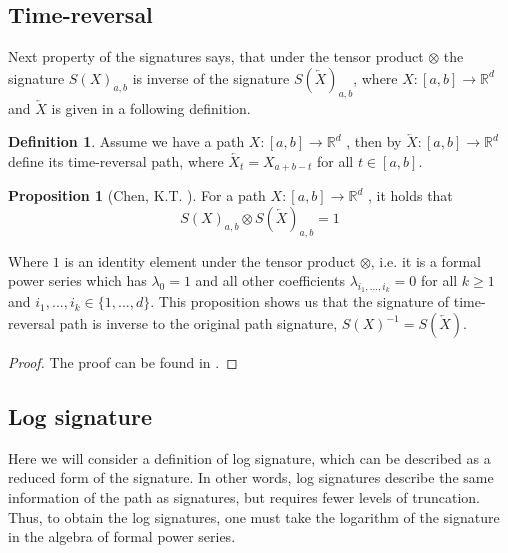 \documentclass[12pt,a4paper]{report}
\theoremstyle{definition}
\newtheorem{proposition}{Proposition}
\newtheorem{definition}{Definition}
\begin{document}
\subsection{Time-reversal}

Next property of the signatures says, that under the tensor product $\otimes$ the signature $S(X)_{a,b}$ is inverse of the signature $S(\overleftarrow{X})_{a,b}$, where $X :[a, b] \rightarrow \mathbb{R}^d$ and $\overleftarrow{X}$ is given in a following definition. %
\begin{definition}
	Assume we have a path $X :[a, b] \rightarrow \mathbb{R}^d$ , then by $\overleftarrow{X} : [a, b] \rightarrow \mathbb{R}^d$ define its time-reversal path, where $\overleftarrow{X_t} = X_{a+b-t}$ for all $t \in [a, b]$.
\end{definition}

\begin{proposition}[Chen, K.T. \cite{chen2001iterated}]
	For a path $X :[a, b] \rightarrow \mathbb{R}^d$ , it holds that 
	\begin{equation}
		S(X)_{a,b}\otimes S(\overleftarrow{X})_{a,b}=1
	\end{equation}
\end{proposition}

	Where $1$ is an identity element under the tensor product $\otimes$, i.e. it is a formal power series which has $\lambda_0=1$ and all other coefficients $\lambda_{i_1, . . . , i_k}=0$ for all $k\geq1$ and $i_1, . . . , i_k\in \{1,...,d\}$. This proposition shows us that the signature of time-reversal path is inverse to the original path signature, $S(X)^{-1}=S(\overleftarrow{X})$.
\begin{proof}
	The proof can be found in \parencite[][Proposition 1.4]{fermanian2021learning}.
\end{proof}	 



\subsection{Log signature}



Here we will consider a definition of log signature, which can be described as a reduced form of the signature. In other words, log signatures describe the same  information of the path as signatures, but requires fewer levels of truncation. Thus, to obtain the log signatures, one must take the logarithm of the signature in the algebra of formal power series. 
\end{document}
